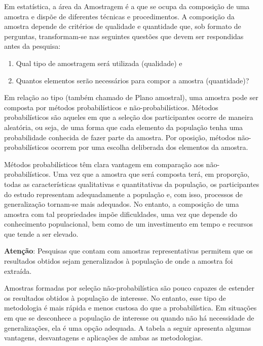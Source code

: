 \documentclass[
]{book}
\providecommand{\tightlist}{%
  \setlength{\itemsep}{0pt}\setlength{\parskip}{0pt}}
\begin{document}
Em estatística, a área da Amostragem é a que se ocupa da composição de uma amostra e dispõe de diferentes técnicas e procedimentos. A composição da amostra depende de critérios de qualidade e quantidade que, sob formato de perguntas, transformam-se nas seguintes questões que devem ser respondidas antes da pesquisa:

\begin{enumerate}
\def\labelenumi{\arabic{enumi})}
\tightlist
\item
  Qual tipo de amostragem será utilizada (qualidade) e\\
\item
  Quantos elementos serão necessários para compor a amostra (quantidade)?
\end{enumerate}

Em relação ao tipo (também chamado de Plano amostral), uma amostra pode ser composta por métodos probabilísticos e não-probabilísticos. Métodos probabilísticos são aqueles em que a seleção dos participantes ocorre de maneira aleatória, ou seja, de uma forma que cada elemento da população tenha uma probabilidade conhecida de fazer parte da amostra. Por oposição, métodos não-probabilísticos ocorrem por uma escolha deliberada dos elementos da amostra.

Métodos probabilísticos têm clara vantagem em comparação aos não-probabilísticos. Uma vez que a amostra que será composta terá, em proporção, todas as características qualitativas e quantitativas da população, os participantes do estudo representam adequadamente a população e, com isso, processos de generalização tornam-se mais adequados. No entanto, a composição de uma amostra com tal propriedades impõe dificuldades, uma vez que depende do conhecimento populacional, bem como de um investimento em tempo e recursos que tende a ser elevado.

\textbf{Atenção}: Pesquisas que contam com amostras representativas permitem que os resultados obtidos sejam generalizados à população de onde a amostra foi extraída.

Amostras formadas por seleção não-probabilística são pouco capazes de estender os resultados obtidos à população de interesse. No entanto, esse tipo de metodologia é mais rápida e menos custosa do que a probabilística. Em situações em que se desconhece a população de interesse ou quando não há necessidade de generalizações, ela é uma opção adequada. A tabela a seguir apresenta algumas vantagens, desvantagens e aplicações de ambas as metodologias.
\end{document}
